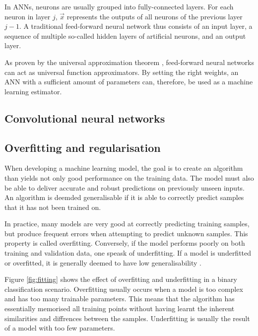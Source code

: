 \documentclass{l4proj}
\begin{document}
In ANNs, neurons are usually grouped into fully-connected layers. For each neuron in layer $j$, $\vec{x}$ represents the outputs of all neurons of the previous layer $j-1$. A traditional feed-forward neural network thus consists of an input layer, a sequence of multiple so-called hidden layers of artificial neurons, and an output layer.

As proven by the universal approximation theorem \citep{csaji_approximation_2001}, feed-forward neural networks can act as universal function approximators. By setting the right weights, an ANN with a sufficient amount of parameters can, therefore, be used as a machine learning estimator.

\subsection{Convolutional neural networks}



\subsection{Overfitting and regularisation}

When developing a machine learning model, the goal is to create an algorithm than yields not only good performance on the training data. The model must also be able to deliver accurate and robust predictions on previously unseen inputs. An algorithm is deemded generalisable if it is able to correctly predict samples that it has not been trained on. 

In practice, many models are very good at correctly predicting training samples, but produce frequent errors when attempting to predict unknown samples. This property is called overfitting. Conversely, if the model performs poorly on both training and validation data, one speask of underfitting. If a model is underfitted or overfitted, it is generally deemed to have low generalisability \citep{burkov_hundred-page_2019}. 

Figure \ref{fig:fitting} shows the effect of overfitting and underfitting in a binary classification scenario. Overfitting usually occurs when a model is too complex and has too many trainable parameters. This means that the algorithm has essentially memorised all training points without having learnt the inherent similarities and diffrences between the samples. Underfitting is usually the result of a model with too few parameters. 
\end{document}
